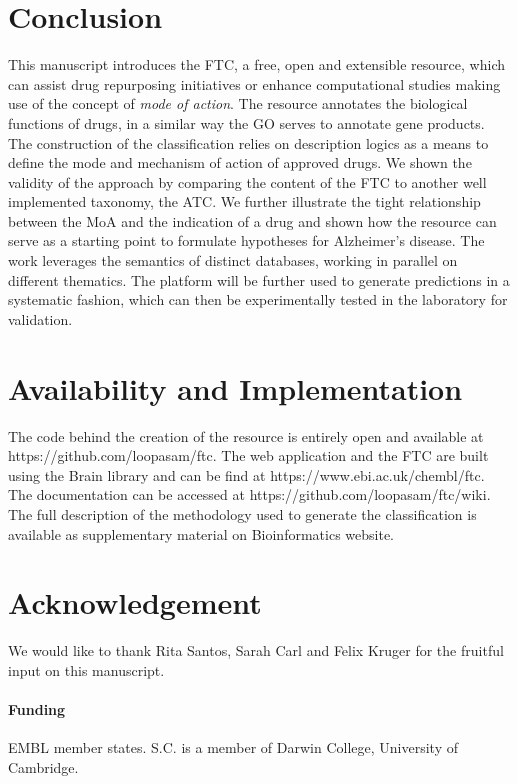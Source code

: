 \documentclass{bioinfo}
\begin{document}
\section{Conclusion}
This manuscript introduces the FTC, a free, open and extensible resource, which can assist drug repurposing 
initiatives or enhance computational studies making use of the concept of \emph{mode of action}.
The resource annotates the biological functions of drugs, in a similar way the GO serves to annotate gene products.
The construction of 
the classification relies on description logics as a means to define the mode and mechanism of action of approved 
drugs. We shown the validity of the approach by comparing the content of the FTC to another well implemented taxonomy, 
the ATC. We further illustrate the tight relationship between the MoA and the indication of a drug and shown how the 
resource can serve as a starting point to formulate hypotheses for Alzheimer's disease. The work leverages the 
semantics of distinct databases, working in parallel on different thematics. The platform will be further used 
to generate predictions in a systematic fashion, which can then be experimentally tested in the laboratory for validation.

\section{Availability and Implementation}\label{impl}
The code behind the creation of the resource is entirely open and available 
at {{https://github.com/loopasam/ftc}}. The web application and the FTC are built using the Brain library \citep{Croset2013} and can be 
find at {{https://www.ebi.ac.uk/chembl/ftc}}. The documentation can be accessed at {{https://github.com/loopasam/ftc/wiki}}. The full
description of the methodology used to generate the classification is available as supplementary material on Bioinformatics website.

\section*{Acknowledgement}
We would like to thank Rita Santos, Sarah Carl and Felix Kruger for the fruitful input on this manuscript.

\paragraph{Funding\textcolon} EMBL member states. S.C. is a member of Darwin College, University of Cambridge.












\end{document}
